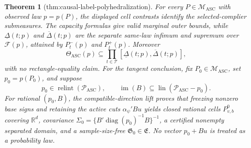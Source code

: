 \documentclass{article}
\newtheorem{theorem}{Theorem}
\begin{document}
\begin{theorem}[thm:causal-label-polyhedralization]\label{thm:causal-label-polyhedralization}
For every \(P\in\mathcal M_{\mathrm{ASC}}\) with observed law \(p=p(P)\), the displayed cell contrasts identify the selected-complier submeasures.  The capacity formulas give valid marginal outer bounds, while \(\underline\Delta(t;p)\) and \(\overline\Delta(t;p)\) are the separate same-law infimum and supremum over \(\mathcal F(p)\), attained by \(P_t^-(p)\) and \(P_t^+(p)\).  Moreover
\[
 \Theta_{\mathrm{ASC}}(p)
 \subseteq
 \prod_{t\in\mathcal T}
 [\underline\Delta(t;p),\overline\Delta(t;p)],
\]
with no rectangle-equality claim.  For the tangent conclusion, fix \(P_0\in\mathcal M_{\mathrm{ASC}}\), set \(p_0=p(P_0)\), and suppose
\[
 p_0\in\operatorname{relint}(\mathcal P_{\mathrm{ASC}}),
 \qquad
 \operatorname{im}(B)\subseteq\operatorname{lin}(\mathcal P_{\mathrm{ASC}}-p_0).
\]
For rational \((p_0,B)\), the compatible-direction lift proves that freezing nonzero base signs and retaining the active cuts \(\alpha_\psi'Bu\) yields closed rational cells \(P_{v,b}^0\) covering \(\mathbb R^d\), covariance \(\Sigma_0=\{B'\operatorname{diag}(p_0)^{-1}B\}^{-1}\), a certified nonempty separated domain, and a sample-size-free \(\mathfrak G_0\in\mathfrak E\).  No vector \(p_0+Bu\) is treated as a probability law.
\end{theorem}
\end{document}
